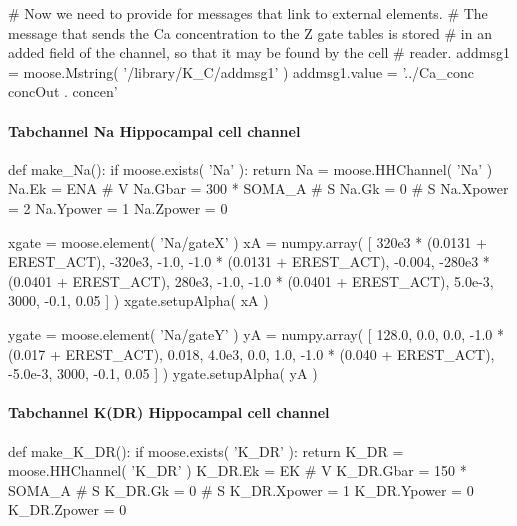 \documentclass[]{article}%
\begin{document}
   # Now we need to provide for messages that link to external elements.
   # The message that sends the Ca concentration to the Z gate tables is stored
   # in an added field of the channel, so that it may be found by the cell
   # reader.
  addmsg1 = moose.Mstring( '/library/K_C/addmsg1' )
  addmsg1.value = '../Ca_conc  concOut  . concen'
\nwendcode{}\nwdocspar

\paragraph{Tabchannel Na Hippocampal cell channel}


\nwenddocs{}\endmoddef\nwstartdeflinemarkup{}\nwenddeflinemarkup
def make_Na():
  if moose.exists( 'Na' ):
    return
  Na = moose.HHChannel( 'Na' )
  Na.Ek = ENA        #  V
  Na.Gbar = 300 * SOMA_A  #  S
  Na.Gk = 0        #  S
  Na.Xpower = 2
  Na.Ypower = 1
  Na.Zpower = 0

  xgate = moose.element( 'Na/gateX' )
  xA = numpy.array( [ 320e3 * (0.0131 + EREST_ACT),
    -320e3, -1.0, -1.0 * (0.0131 + EREST_ACT), -0.004, 
    -280e3 * (0.0401 + EREST_ACT), 280e3, -1.0, 
    -1.0 * (0.0401 + EREST_ACT), 5.0e-3, 
    3000, -0.1, 0.05 ] )
  xgate.setupAlpha( xA )

  ygate = moose.element( 'Na/gateY' )
  yA = numpy.array( [ 128.0, 0.0, 0.0, -1.0 * (0.017 + EREST_ACT), 0.018,
    4.0e3, 0.0, 1.0, -1.0 * (0.040 + EREST_ACT), -5.0e-3, 
    3000, -0.1, 0.05 ] )
  ygate.setupAlpha( yA )

\eatline
{}\nwendcode{}\nwdocspar


\paragraph{Tabchannel K(DR) Hippocampal cell channel}

\nwenddocs{}\endmoddef\nwstartdeflinemarkup{}\nwenddeflinemarkup
def make_K_DR():
  if moose.exists( 'K_DR' ):
    return
  K_DR = moose.HHChannel( 'K_DR' )
  K_DR.Ek = EK        #  V
  K_DR.Gbar = 150 * SOMA_A  #  S
  K_DR.Gk = 0        #  S
  K_DR.Xpower = 1
  K_DR.Ypower = 0
  K_DR.Zpower = 0
\end{document}
